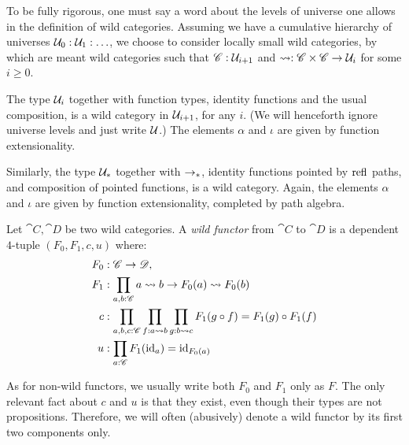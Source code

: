 \documentclass[english,a4paper]{lmcs}
\begin{document}
\begin{rem}
  To be fully rigorous, one must say a word about the levels of universe one
  allows in the definition of wild categories. Assuming we have a cumulative
  hierarchy of universes $\mathcal{U}_0 : \mathcal{U}_1 : \ldots$, we choose to consider
  locally small wild categories, by which are meant wild categories such that
  $\mathscr{C}:\mathcal{U}_{i+1}$ and $\hom(,): \cat C \times \cat C \to \UU_i$ for some
  $i\geq 0$.
  \label{rem:universes-locally-small-cats}
\end{rem}

\begin{exa}
  The type $\mathcal{U}_i$ together with function types, identity functions and the
	usual composition, is a wild category in $\mathcal{U}_{i+1}$, for any $i$. (We will henceforth ignore universe levels and just write $\mathcal{U}$.) The elements $\alpha$ and $\iota$ are
  given by function extensionality.

  Similarly, the type $\mathcal{U}_*$ together with $\to_\ast$, identity functions
  pointed by $\mathop{{\mathrm{refl}}_{}}$ paths, and composition of pointed functions, is a wild
  category. Again, the elements $\alpha$ and $\iota$ are given by function
  extensionality, completed by path algebra.
\end{exa}

\begin{defi}
  Let $\cat C,\cat D$ be two wild categories.
  A \emph{wild functor} from $\cat C$ to $\cat D$ is a dependent $4$-tuple $(F_0,F_1,c,u)$ where:
  \begin{align*}
    F_0 &:\cat C \to \cat D,\\
    F_1 &:\prod_{a,b:\cat C} \hom(a,b) \to \hom(F_0(a), F_0(b))\\
    c &: \prod_{a,b,c:\cat C}\prod_{f:\hom(a,b)}\prod_{g:\hom(b,c)}F_1(g\circ f) = F_1(g) \circ F_1(f)\\
    u &: \prod_{a:\cat C} F_1(\id_a) = \id_{F_0(a)}
  \end{align*}
  \label{def:wild-functor}
\end{defi}

As for non-wild functors, we usually write both $F_0$ and $ F_1$ only as $F$.
The only relevant fact about $c$ and $u$ is that they exist, even though their
types are not propositions. Therefore, we will often (abusively) denote a wild
functor by its first two components only.
\end{document}
